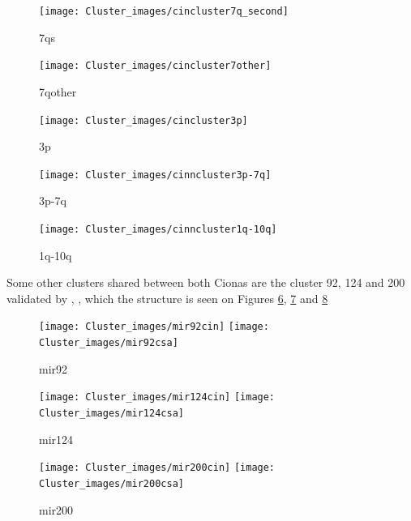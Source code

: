 \documentclass[11pt]{article}
\begin{document}
\newpage

\begin{figure}[htb!]
\centering
\texttt{[image: Cluster\_images/cincluster7q\_second]} 
\caption{7qs}
\label{7qs}
\end{figure}

\begin{figure}[htb!]
\centering
\texttt{[image: Cluster\_images/cincluster7other]} 
\caption{7qother}
\label{7qother}
\end{figure}


\begin{figure}[htb!]
\centering
\texttt{[image: Cluster\_images/cincluster3p]} 
\caption{3p}
\label{3p}
\end{figure}


\begin{figure}[htb!]
\centering
\texttt{[image: Cluster\_images/cinncluster3p-7q]} 
\caption{3p-7q}
\label{3p-7q}
\end{figure}



\begin{figure}[htb!]
\centering
\texttt{[image: Cluster\_images/cinncluster1q-10q]} 
\caption{1q-10q}
\label{1q-10q}
\end{figure}


Some other clusters shared between both Cionas are the cluster 92, 124 and 200  validated by \cite{Norden-Krichmar2007}, \cite{Fu2008}, \cite{Hendrix2010} which the structure is seen on Figures \ref{mir92}, \ref{mir124} and \ref{mir200}    

\begin{figure}[htb!]
\centering
\texttt{[image: Cluster\_images/mir92cin]} \quad \texttt{[image: Cluster\_images/mir92csa]} 
\caption{mir92}
\label{mir92}
\end{figure}

\begin{figure}[htb!]
\centering
\texttt{[image: Cluster\_images/mir124cin]} \quad \texttt{[image: Cluster\_images/mir124csa]} 
\caption{mir124}
\label{mir124}
\end{figure}

\begin{figure}[htb!]
\centering
\texttt{[image: Cluster\_images/mir200cin]} \quad \texttt{[image: Cluster\_images/mir200csa]} 
\caption{mir200}
\label{mir200}

\end{figure}
\end{document}
